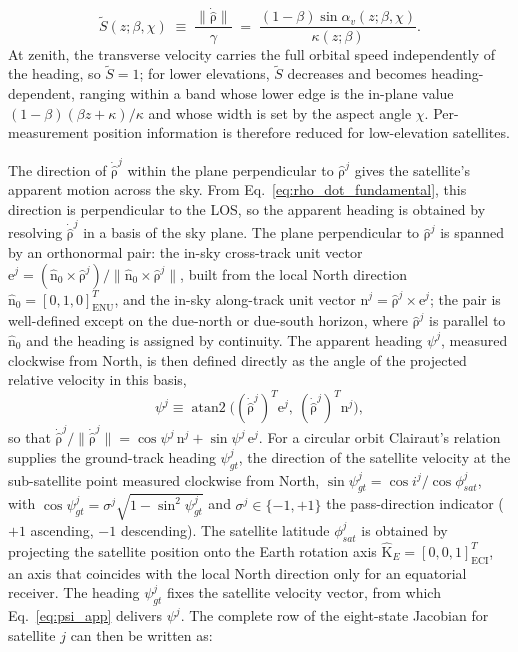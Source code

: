 \documentclass[letterpaper,times]{IONconf-v2}
\theoremstyle{plain}
\theoremstyle{remark}
\renewcommand{\vec}[1]{{\boldsymbol{\mathrm{#1}}}}
\begin{document}
%
\begin{equation}\label{eq:S_scaling}
\tilde{S}(z;\beta,\chi) \;\equiv\; \frac{\|\dot{\hat{\vec\rho}}\|}{\gamma} \;=\; \frac{(1-\beta)\sin\alpha_v(z;\beta,\chi)}{\kappa(z;\beta)} .
\end{equation}
%
At zenith, the transverse velocity carries the full orbital speed independently of the heading, so $\tilde S=1$; for lower elevations, $\tilde S$ decreases and becomes heading-dependent, ranging within a band whose lower edge is the in-plane value $(1-\beta)(\beta z+\kappa)/\kappa$ and whose width is set by the aspect angle $\chi$. Per-measurement position information is therefore reduced for low-elevation satellites.

The direction of $\dot{\hat{\vec\rho}}^j$ within the plane perpendicular to $\hat{\vec\rho}^j$ gives the satellite's apparent motion across the sky. 
From Eq.~\eqref{eq:rho_dot_fundamental}, this direction is perpendicular to the LOS,
so the apparent heading is obtained by resolving $\dot{\hat{\vec\rho}}^j$ in a basis of the sky plane. The plane perpendicular to $\hat{\vec\rho}^j$ is spanned by an orthonormal pair: the in-sky cross-track unit vector $\vec{e}^j = (\hat{\vec n}_0\times\hat{\vec\rho}^j)/\|\hat{\vec n}_0\times\hat{\vec\rho}^j\|$, built from the local North direction $\hat{\vec n}_0 = [0,1,0]^T_{\mathrm{ENU}}$, and the in-sky along-track unit vector $\vec{n}^j = \hat{\vec\rho}^j\times\vec{e}^j$; the pair is well-defined except on the due-north or due-south horizon, where $\hat{\vec\rho}^j$ is parallel to $\hat{\vec n}_0$ and the heading is assigned by continuity. The apparent heading $\psi^j$, measured clockwise from North, is then defined directly as the angle of the projected relative velocity in this basis,
\begin{equation}\label{eq:psi_app}
\psi^j \equiv \operatorname{atan2}\!\big((\dot{\hat{\vec\rho}}^j)^T\vec{e}^j,\ (\dot{\hat{\vec\rho}}^j)^T\vec{n}^j\big),
\end{equation}
so that $\dot{\hat{\vec\rho}}^j/\|\dot{\hat{\vec\rho}}^j\| = \cos\psi^j\,\vec{n}^j + \sin\psi^j\,\vec{e}^j$. For a circular orbit Clairaut's relation \parencite{Geyer2016} supplies the ground-track heading $\psi_{gt}^j$, the direction of the satellite velocity at the sub-satellite point measured clockwise from North, $\sin\psi_{gt}^j = \cos i^j/\cos\phi_{sat}^j$, with $\cos\psi_{gt}^j = \sigma^j\sqrt{1-\sin^2\psi_{gt}^j}$ and $\sigma^j\in\{-1,+1\}$ the pass-direction indicator ($+1$ ascending, $-1$ descending). The satellite latitude $\phi_{sat}^j$ is obtained by projecting the satellite position onto the Earth rotation axis $\hat{\vec K}_{E} = [0,0,1]^T_{\mathrm{ECI}}$, an axis that coincides with the local North direction only for an equatorial receiver. The heading $\psi_{gt}^j$ fixes the satellite velocity vector, from which Eq.~\eqref{eq:psi_app} delivers $\psi^j$. The complete row of the eight-state Jacobian for satellite $j$ can then be written as:
\end{document}
